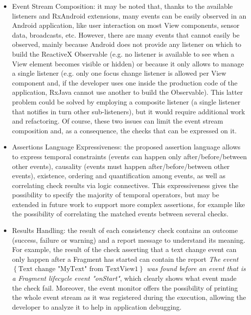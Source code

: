 \documentclass[11pt,a4paper,notitlepage]{article}
\begin{document}
\begin{itemize}
	\item Event Stream Composition: it may be noted that, thanks to the available listeners and RxAndroid extensions, many events can be easily observed in an Android application, like user interaction on most View components, sensor data, broadcasts, etc. However, there are many events that cannot easily be observed, mainly because Android does not provide any listener on which to build the ReactiveX Observable (e.g. no listener is available to see when a View element becomes visible or hidden) or because it only allows to manage a single listener (e.g. only one focus change listener is allowed per View component and, if the developer uses one inside the production code of the application, RxJava cannot use another to build the Observable). This latter problem could be solved by employing a composite listener (a single listener that notifies in turn other sub-listeners), but it would require additional work and refactoring. Of course, these two issues can limit the event stream composition and, as a consequence, the checks that can be expressed on it.
	\item Assertions Language Expressiveness: the proposed assertion language allows to express temporal constraints (events can happen only after/before/between other events), causality (events must happen after/before/between other events), existence, ordering and quantification among events, as well as correlating check results via logic connectives. This expressiveness gives the possibility to specify the majority of temporal operators, but may be extended in future work to support more complex assertions, for example like the possibility of correlating the matched events between several checks.
	\item Results Handling: the result of each consistency check contains an outcome (success, failure or warning) and a report message to understand its meaning. For example, the result of the check asserting that a text change event can only happen after a Fragment has started can contain the report \textit{The event $\left\{\mbox{Text change "MyText" from TextView1}\right\}$ was found before an event that is a Fragment lifecycle event "onStart"}, which clearly shows what event made the check fail. Moreover, the event monitor offers the possibility of printing the whole event stream as it was registered during the execution, allowing the developer to analyze it to help in application debugging.
\end{itemize}
\end{document}
